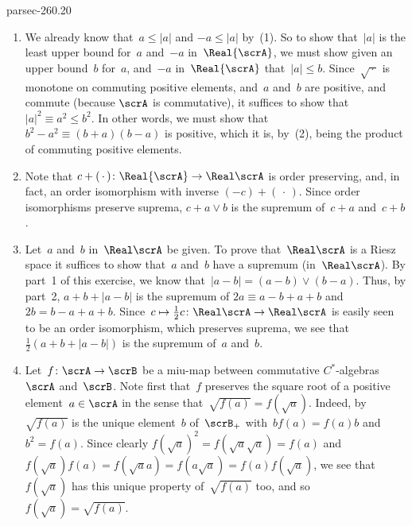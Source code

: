 \documentclass[b5page]{book}
\begin{document}
\begin{solution}{parsec-260.20}
\begin{enumerate}
\item
We already know that~$a\leq \left|a\right|$
and $-a\leq \left|a\right|$ by~(1).
So to show that~$\left|a\right|$
is the least upper bound for~$a$ and~$-a$
    in~$\Real{\scrA}$,
we must show
    given an upper bound~$b$ for~$a$, and~$-a$ in~$\Real{\scrA}$
that~$\left|a\right|\leq b$.
        Since~$\sqrt{\,\cdot\,}$ is monotone
        on commuting positive elements,
        and~$a$ and~$b$ are positive, and commute (because
        $\scrA$ is commutative),
        it suffices to show that
        $\left|a\right|^2\equiv a^2 \leq b^2$.
In other words,
we must show that~$b^2-a^2\equiv (b+a)(b-a)$ is positive,
which it is,
by~(2),
being the product of commuting positive elements.
\item
Note that $c+(\,\cdot\,)\colon \Real{\scrA}\to\Real\scrA$
is order preserving,
and, in fact,
an order isomorphism
with inverse $(-c)+(\,\cdot\,)$.
Since order isomorphisms preserve suprema,
$c+a\vee b$ is the supremum
of~$c+a$ and~$c+b$.
\item
Let~$a$ and~$b$ in~$\Real\scrA$
be given.
To prove that~$\Real\scrA$
is a Riesz space
it suffices to show that~$a$ and~$b$ have a supremum
(in~$\Real\scrA$).
By part~1 of this exercise,
we know that~$\left|a-b\right|=(a-b)\vee (b-a)$.
Thus,
by part~2, 
$a+b+\left|a-b\right|$
is the supremum of $2a\equiv a-b+a+b$
and~$2b=b-a+a+b$.
Since~$c\mapsto \frac{1}{2}c\colon \Real\scrA\to\Real\scrA$
is easily seen to be an order isomorphism,
which preserves suprema,
we see that $\frac{1}{2}(a+b+\left|a-b\right|)$
is the supremum of~$a$ and~$b$.
\item
Let~$f\colon \scrA\to\scrB$
be a miu-map between commutative 
$C^*$-algebras~$\scrA$ and~$\scrB$.
Note first that~$f$ preserves the square root
of a positive element~$a\in\scrA$
in the sense that~$\sqrt{f(a)} = f(\sqrt{a})$.
Indeed, 
by~
$\sqrt{f(a)}$
 is the unique element~$b$ of~$\scrB_+$
with~$bf(a)=f(a)b$ and~$b^2=f(a)$.
Since clearly  $f(\sqrt{a})^2 = f(\sqrt{a}\sqrt{a})=f(a)$
and~$f(\sqrt{a})f(a)=f(\sqrt{a}a)=f(a\sqrt{a})=f(a)f(\sqrt{a})$,
we see that~$f(\sqrt{a})$ has this unique property of~$\sqrt{f(a)}$
too,
and so $f(\sqrt{a})=\sqrt{f(a)}$.


\end{enumerate}
\end{solution}
\end{document}
